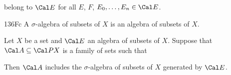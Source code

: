 \noindent  belong to $\Cal E$ for all $E$, $F$,
$E_0,\ldots,E_n\in\Cal E$.   

\spheader 136Fc A $\sigma$-algebra of subsets of $X$ is an algebra of subsets of $X$.

 Let $X$ be a set and $\Cal E$ an algebra
of subsets of $X$.   Suppose that $\Cal A\subseteq\Cal PX$ is a family
of sets such that


\noindent Then $\Cal A$ includes the $\sigma$-algebra of subsets of $X$
generated by $\Cal E$.


